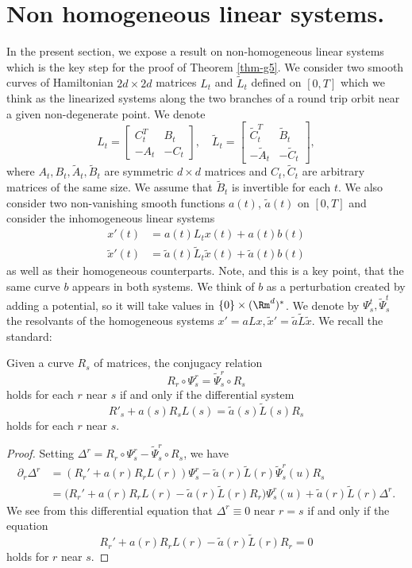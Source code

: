 \section{Non homogeneous linear systems.}\label{sec-nhls}

In the present section, we expose a result on non-homogeneous linear systems which is the key step for the proof
of Theorem \ref{thm-g5}.
We consider two smooth curves of Hamiltonian $2d\times 2d$ matrices $L_t$ and $\tilde L_t$ defined on $[0,T]$
which we think as the linearized systems along the two branches of a round trip orbit near a given non-degenerate point.
We denote
\[
L_t=
\begin{bmatrix}
C_t^T & B_t\\-A_t &-C _t
\end{bmatrix}, \quad
\tilde L_t=
\begin{bmatrix}
\tilde C_t^T & \tilde B_t\\-\tilde A_t &-\tilde C_t
\end{bmatrix},
\]
where $A_t, B_t, \tilde A_t, \tilde B_t$ are symmetric $d\times d$ matrices and $C_t, \tilde C_t$ are arbitrary
matrices of the same size. We assume that $\tilde B_t$ is invertible for each $t$.
We also consider two non-vanishing smooth functions $a(t)$, $\tilde a(t)$ on $[0,T]$ and consider the inhomogeneous linear systems
\begin{align*}
x'(t) & = a(t)L_t x(t)+a(t)b(t)\\
\tilde x'(t)&=\tilde a(t)\tilde L_t \tilde x(t)+\tilde a(t) b(t)
\end{align*}
as well as their homogeneous counterparts. Note, and this is a key point, that the same curve $b$ appears in both systems.
We think of $b$ as a perturbation created by adding a potential, so it will take values in $\{0\}\times (\Rm^d)^*$.
We denote by $\Psi_s^t, \tilde \Psi_s^t$ the resolvants of the homogeneous systems $x'=aLx, \tilde x'= \tilde a \tilde L \tilde x$.
We recall the standard:

\begin{lem}\label{lem-cr}
Given a curve $R_s$ of matrices, the conjugacy relation
\[
R_r\circ \Psi_s^r= \tilde \Psi_s^r \circ R_s
\]
holds for each $r$ near $s$ if and only if the differential system
\[
R'_s +a(s) R_s L(s) =\tilde a(s)\tilde L(s) R_s
\]
holds for each $r$ near $s$.
\end{lem}

\begin{proof}
Setting $\Delta^r=R_{r}\circ \Psi_s^r -\tilde \Psi_{s}^{r}\circ R_s$, we have
\begin{align*}
\partial_r \Delta^r
&=(R_{r}' +a(r)R_{r}L(r))\Psi_s^r-\tilde a(r)\tilde L(r)\tilde \Psi_{s}^{r}(u)R_s\\
&=\big(R_{r}' +a(r)R_{r}L(r)-\tilde a(r)\tilde L(r)R_{r}\big)\Psi_s^r(u)+\tilde a(r)\tilde L(r)\Delta^r.
\end{align*}
We see from this differential equation that $\Delta^r\equiv 0$ near $r=s$ if and only if the equation
\[
R_{r}' +a(r)R_{r}L(r)-\tilde a(r)\tilde L(r)R_{r}=0
\]
holds for $r$ near $s$.
\end{proof}

